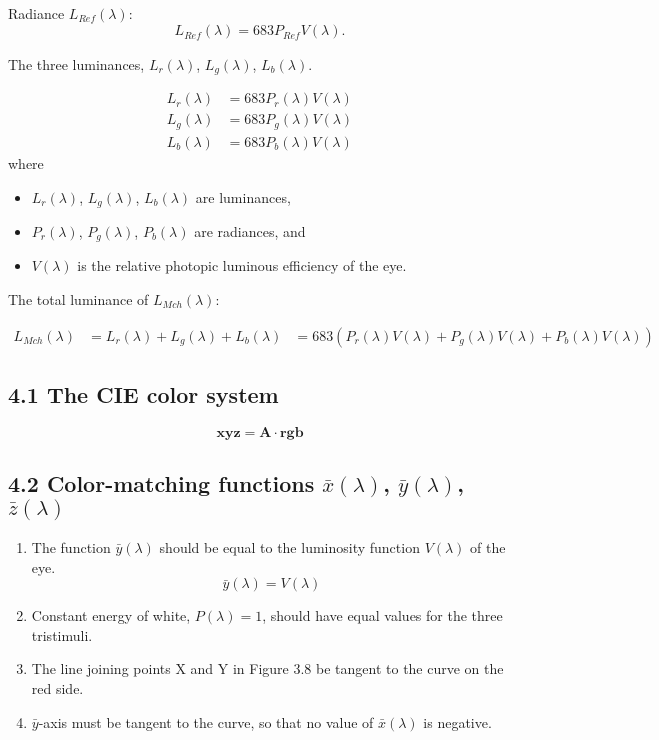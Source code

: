 \documentclass [a4paper,fleqn] {jarticle}
\newcommand\V[1]{\ensuremath {\boldsymbol {#1}}}
\newcommand\M[1]{\ensuremath {\boldsymbol {#1}}}
\begin{document}
Radiance $L_{\mathit {Ref}}(\lambda)$:
%
\[ L_{\mathit {Ref}}(\lambda) = 683 P_{\mathit {Ref}}V(\lambda). \]

The three luminances, $L_r(\lambda)$, $L_g(\lambda)$, $L_b(\lambda)$.

\begin {align*}
  L_r(\lambda) &= 683 P_r(\lambda)V(\lambda) \\
  L_g(\lambda) &= 683 P_g(\lambda)V(\lambda) \\
  L_b(\lambda) &= 683 P_b(\lambda)V(\lambda)
\end {align*}
%
where
\begin {itemize}
\item $L_r(\lambda)$, $L_g(\lambda)$, $L_b(\lambda)$ are luminances,
\item $P_r(\lambda)$, $P_g(\lambda)$, $P_b(\lambda)$ are radiances, and
\item $V(\lambda)$ is the relative photopic luminous efficiency of the eye.
\end {itemize}

The total luminance of $L_{\mathit {Mch}}(\lambda)$:

\begin {align*}
  L_{\mathit {Mch}}(\lambda)
    &= L_r(\lambda) + L_g(\lambda) + L_b(\lambda)
    &= 683 (P_r(\lambda)V(\lambda) +
            P_g(\lambda)V(\lambda) +
            P_b(\lambda)V(\lambda))
\end {align*}

\subsection* {4.1 The CIE color system}

\[ \V {xyz} = \M {A} \cdot \V {rgb} \]

\subsection* {4.2 Color-matching functions $\bar {x}(\lambda)$, $\bar {y}(\lambda)$, $\bar {z}(\lambda)$}

\begin {enumerate}

\item The function $\bar y(\lambda)$ should be equal to the luminosity function $V(\lambda)$ of the eye.
%
\[ \bar y(\lambda) = V(\lambda) \]

\item Constant energy of white, $P(\lambda) = 1$, should have equal values for the three tristimuli.

\item The line joining points X and Y in Figure 3.8 be tangent to the curve on the red side.

\item $\bar y$-axis must be tangent to the curve, so that no value of $\bar x(\lambda)$ is negative.

\end {enumerate}
\end{document}
